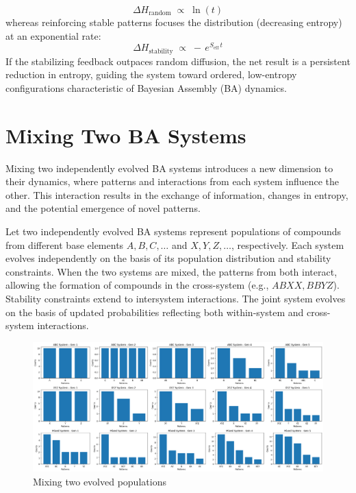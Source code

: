 \documentclass[entropy,article,submit,pdftex,moreauthors]{Definitions/mdpi}
\begin{document}
\begin{equation}
\Delta H_{\text{random}} \;\propto\; \ln(t)
\end{equation}
whereas reinforcing stable patterns focuses the distribution (decreasing entropy) at an exponential rate:
\begin{equation}
\Delta H_{\text{stability}} \;\propto\; -\,e^{S_{\mathrm{eff}}\,t}
\end{equation}
If the stabilizing feedback outpaces random diffusion, the net result is a persistent reduction in entropy, guiding the system toward ordered, low-entropy configurations characteristic of Bayesian Assembly (BA) dynamics.

\section{Mixing Two BA Systems}

Mixing two independently evolved BA systems introduces a new dimension to their dynamics, where patterns and interactions from each system influence the other. This interaction results in the exchange of information, changes in entropy, and the potential emergence of novel patterns. 

Let two independently evolved BA systems represent populations of compounds from different base elements \( A, B, C, \dots \) and \( X, Y, Z, \dots \), respectively. Each system evolves independently on the basis of its population distribution and stability constraints. When the two systems are mixed, the patterns from both interact, allowing the formation of compounds in the cross-system (e.g., \( ABXX, BBYZ \)). Stability constraints extend to intersystem interactions. The joint system evolves on the basis of updated probabilities reflecting both within-system and cross-system interactions.

\begin{figure}[htp]
    \centering
    \includegraphics[width=13cm]{mixed_1}
    \caption{Mixing two evolved populations}
    \label{fig:mixed_1}
\end{figure}
\end{document}
